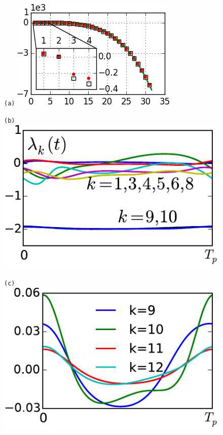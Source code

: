 \documentclass[prl,aps,preprint,showpacs]{revtex4-1} %
\begin{document}
\begin{figure}[h]
  \centering
  \begin{minipage}{.23\textwidth}
    \centering \small{\texttt{(a)}}
    \includegraphics[width=\textwidth]{ppo1FEs}
  \end{minipage}
  \begin{minipage}{.23\textwidth}
    \centering \small{\texttt{(b)}}
    \includegraphics[width=\textwidth]{localFE1}
  \end{minipage}
  \begin{minipage}{.23\textwidth}
    \centering \small{\texttt{(c)}}
    \includegraphics[width=\textwidth]{localFE2}

\end{minipage}
\end{figure}
\end{document}
